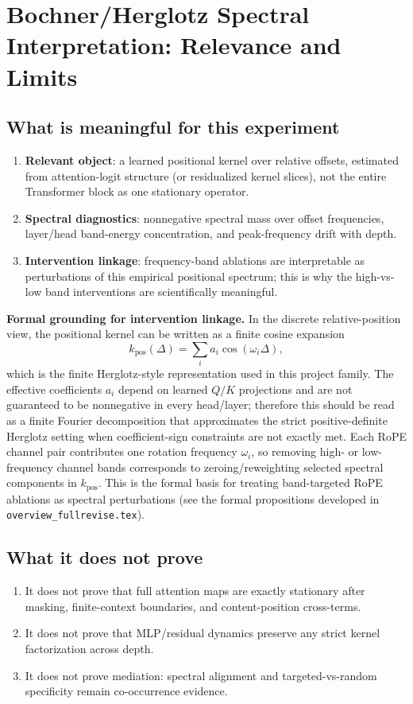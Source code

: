 \documentclass[11pt]{article}
\begin{document}
\section{Bochner/Herglotz Spectral Interpretation: Relevance and Limits}
\subsection*{What is meaningful for this experiment}
\begin{enumerate}[leftmargin=*]
  \item \textbf{Relevant object}: a learned positional kernel over relative offsets, estimated from attention-logit structure (or residualized kernel slices), not the entire Transformer block as one stationary operator.
  \item \textbf{Spectral diagnostics}: nonnegative spectral mass over offset frequencies, layer/head band-energy concentration, and peak-frequency drift with depth.
  \item \textbf{Intervention linkage}: frequency-band ablations are interpretable as perturbations of this empirical positional spectrum; this is why the high-vs-low band interventions are scientifically meaningful.
\end{enumerate}

\noindent
\textbf{Formal grounding for intervention linkage.} In the discrete relative-position view, the positional kernel can be written as a finite cosine expansion
\[
k_{\text{pos}}(\Delta)=\sum_i a_i\cos(\omega_i\Delta),
\]
which is the finite Herglotz-style representation used in this project family. The effective coefficients \(a_i\) depend on learned \(Q/K\) projections and are not guaranteed to be nonnegative in every head/layer; therefore this should be read as a finite Fourier decomposition that approximates the strict positive-definite Herglotz setting when coefficient-sign constraints are not exactly met. Each RoPE channel pair contributes one rotation frequency \(\omega_i\), so removing high- or low-frequency channel bands corresponds to zeroing/reweighting selected spectral components in \(k_{\text{pos}}\). This is the formal basis for treating band-targeted RoPE ablations as spectral perturbations (see the formal propositions developed in \texttt{overview\_fullrevise.tex}).

\subsection*{What it does not prove}
\begin{enumerate}[leftmargin=*]
  \item It does not prove that full attention maps are exactly stationary after masking, finite-context boundaries, and content-position cross-terms.
  \item It does not prove that MLP/residual dynamics preserve any strict kernel factorization across depth.
  \item It does not prove mediation: spectral alignment and targeted-vs-random specificity remain co-occurrence evidence.
\end{enumerate}
\end{document}
